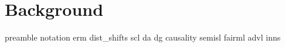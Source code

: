 \chapter{Background}\label{ch:background}
{preamble}
{notation}
{erm}
{dist_shifts}
{scl}
{da}
{dg}
{causality}
{semisl}
{fairml}
{advl}
{inns}

